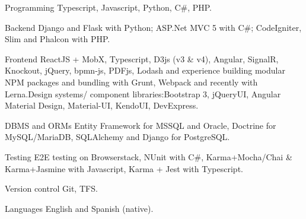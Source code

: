 


\begin{cvskills}


\cvskill
{Programming} %
{Typescript, Javascript, Python, C\#, PHP.} %


\cvskill
{Backend} %
{Django and Flask with Python; ASP.Net MVC 5 with C\#; CodeIgniter, Slim and Phalcon with PHP.} %


\cvskill
{Frontend} %
{\newline ReactJS + MobX, Typescript, D3js (v3 \& v4), Angular, SignalR, Knockout, jQuery, bpmn-js, PDFjs, Lodash and experience building modular NPM packages and bundling with Grunt, Webpack and recently with Lerna.\newline Design systems/ component libraries:\newline Bootstrap 3, jQueryUI, Angular Material Design, Material-UI, KendoUI, DevExpress.} %


\cvskill
{DBMS and ORMs} %
{\newline Entity Framework for MSSQL and Oracle, Doctrine for MySQL/MariaDB, SQLAlchemy and Django for PostgreSQL.} %



\cvskill
{Testing} %
{\newline E2E testing on Browserstack, NUnit with C\#, Karma+Mocha/Chai \& Karma+Jasmine with Javascript, Karma + Jest with Typescript.} %



\cvskill
{Version control} %
{Git, TFS.} %



\cvskill
{Languages} %
{English and Spanish (native).} %


\end{cvskills}
